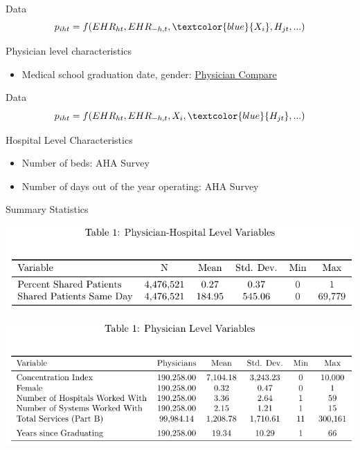 \documentclass[10pt]{beamer}
\begin{document}
\begin{frame}{Data}
\begin{equation*}
    p_{iht}=f(EHR_{ht},EHR_{-h,t},\textcolor{blue}{X_i},H_{jt},...)
\end{equation*}

\vspace{5mm}

Physician level characteristics
\begin{itemize}
    \item Medical school graduation date, gender: \underline{Physician Compare}
\end{itemize}
\end{frame}

\begin{frame}{Data}
\begin{equation*}
    p_{iht}=f(EHR_{ht},EHR_{-h,t},X_i,\textcolor{blue}{H_{jt}},...)
\end{equation*}

\vspace{5mm}

Hospital Level Characteristics
\begin{itemize}
    \item Number of beds: AHA Survey
    \item Number of days out of the year operating: AHA Survey
\end{itemize}
\end{frame}

\begin{frame}{Summary Statistics}
\centering

\includegraphics[scale=.8]{Objects/sumstats_pair_table.pdf}

\vspace{3mm}

\includegraphics[scale=.8]{Objects/sumstats_physician_table.pdf}

\end{frame}
\end{document}
